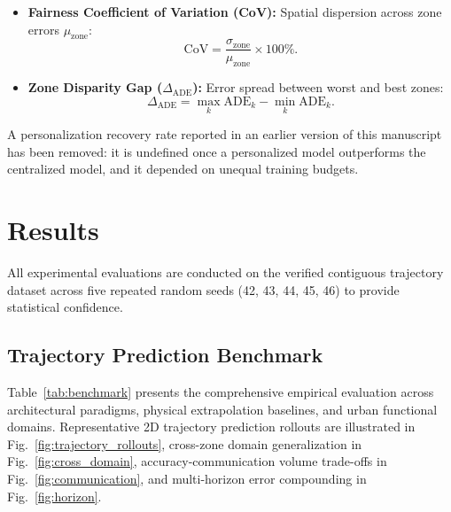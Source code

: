 \documentclass[journal]{IEEEtran}
\begin{document}
\begin{itemize}
    \begin{equation}
    \mathrm{NADE} = \frac{\mathrm{ADE}}{\frac{1}{N} \sum_{i=1}^N \sum_{t=1}^{T_{\mathrm{pred}}} \|p_t^{(i)} - p_{t-1}^{(i)}\|_2} \times 100\%.
    \label{eq:nade}
    \end{equation}
    Normalizing against the actual cumulative path length traversed rather than net linear displacement ensures that curvature, deceleration loops, and turning maneuvers across urban intersections are accurately captured without distortion.
    \item \textbf{Fairness Coefficient of Variation (CoV):} Spatial dispersion across zone errors $\mu_{\mathrm{zone}}$:
    \begin{equation}
    \mathrm{CoV} = \frac{\sigma_{\mathrm{zone}}}{\mu_{\mathrm{zone}}} \times 100\%.
    \label{eq:cov}
    \end{equation}
    \item \textbf{Zone Disparity Gap ($\Delta_{\mathrm{ADE}}$):} Error spread between worst and best zones:
    \begin{equation}
    \Delta_{\mathrm{ADE}} = \max_k \mathrm{ADE}_k - \min_k \mathrm{ADE}_k.
    \label{eq:disparity_gap}
    \end{equation}
\end{itemize}
A personalization recovery rate reported in an earlier version of this manuscript has been removed: it is undefined once a personalized model outperforms the centralized model, and it depended on unequal training budgets.

\section{Results}
\label{sec:results}
All experimental evaluations are conducted on the verified contiguous trajectory dataset across five repeated random seeds (42, 43, 44, 45, 46) to provide statistical confidence.

\subsection{Trajectory Prediction Benchmark}
Table~\ref{tab:benchmark} presents the comprehensive empirical evaluation across architectural paradigms, physical extrapolation baselines, and urban functional domains. Representative 2D trajectory prediction rollouts are illustrated in Fig.~\ref{fig:trajectory_rollouts}, cross-zone domain generalization in Fig.~\ref{fig:cross_domain}, accuracy-communication volume trade-offs in Fig.~\ref{fig:communication}, and multi-horizon error compounding in Fig.~\ref{fig:horizon}.
\end{document}
